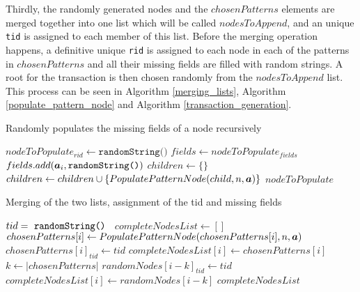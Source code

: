 \documentclass{acm_proc_article-sp-sigmod09}
\begin{document}
Thirdly, the randomly generated nodes and the $chosenPatterns$ elements are merged together into one list which will be called $nodesToAppend$, and an unique \texttt{tid} is assigned to each member of this list. Before the merging operation happens, a definitive unique \texttt{rid} is assigned to each node in each of the patterns in $chosenPatterns$ and all their missing fields are filled with random strings. A root for the transaction is then chosen randomly from the $nodesToAppend$ list. This process can be seen in Algorithm \ref{merging_lists}, Algorithm \ref{populate_pattern_node} and Algorithm \ref{transaction_generation}.

\begin{algorithm}
\caption{Randomly populates the missing fields of a node recursively}
\label{populate_pattern_node}
\begin{algorithmic}[1]
\State $nodeToPopulate_{rid} \gets \texttt{randomString()}$
\State $fields \gets nodeToPopulate_{fields}$
		\State $fields.add(\boldsymbol{a}_i, \text{\texttt{randomString()}})$
	\EndIf
\EndFor
\State $children \gets \{\}$
	\State $children \gets children \cup \{Populate\-Pattern\-Node(child, n, \boldsymbol{a})\}$
\EndFor
\Return $nodeToPopulate$
\EndFunction
\end{algorithmic}
\end{algorithm}

\begin{algorithm}
\caption{Merging of the two lists, assignment of the tid and missing fields}
\label{merging_lists}
\begin{algorithmic}[1]
\State $tid = \text{ \texttt{randomString() }}$
\State $completeNodesList \gets []$
    \State $chosenPatterns[i] \gets Populate\-Pattern\-Node(chosenPatterns[i], n, \boldsymbol{a})$
    \State $chosenPatterns[i]_{tid} \gets tid$
    \State $completeNodesList[i] \gets chosenPatterns[i]$
\EndFor
\State $k \gets |chosenPatterns|$
    \State $randomNodes[i - k]_{tid} \gets tid$
    \State $completeNodesList[i] \gets randomNodes[i - k]$
\EndFor
\Return $completeNodesList$
\EndFunction
\end{algorithmic}
\end{algorithm}
\end{document}
